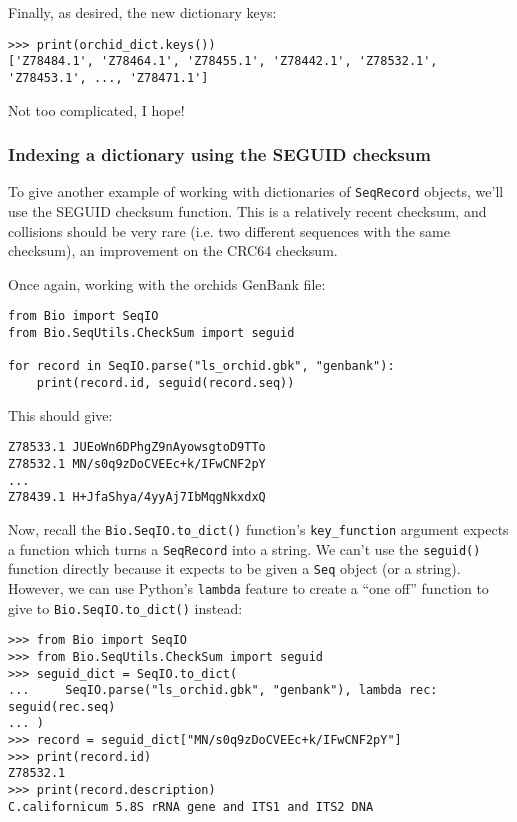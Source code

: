 \noindent Finally, as desired, the new dictionary keys:

\begin{verbatim}
>>> print(orchid_dict.keys())
['Z78484.1', 'Z78464.1', 'Z78455.1', 'Z78442.1', 'Z78532.1', 'Z78453.1', ..., 'Z78471.1']
\end{verbatim}

\noindent Not too complicated, I hope!

\subsubsection{Indexing a dictionary using the SEGUID checksum}

To give another example of working with dictionaries of \verb|SeqRecord| objects, we'll use the SEGUID checksum function.  This is a relatively recent checksum, and collisions should be very rare (i.e. two different sequences with the same checksum), an improvement on the CRC64 checksum.

Once again, working with the orchids GenBank file:

\begin{verbatim}
from Bio import SeqIO
from Bio.SeqUtils.CheckSum import seguid

for record in SeqIO.parse("ls_orchid.gbk", "genbank"):
    print(record.id, seguid(record.seq))
\end{verbatim}

\noindent This should give:

\begin{verbatim}
Z78533.1 JUEoWn6DPhgZ9nAyowsgtoD9TTo
Z78532.1 MN/s0q9zDoCVEEc+k/IFwCNF2pY
...
Z78439.1 H+JfaShya/4yyAj7IbMqgNkxdxQ
\end{verbatim}

Now, recall the \verb|Bio.SeqIO.to_dict()| function's \verb|key_function| argument expects a function which turns a \verb|SeqRecord| into a string.  We can't use the \verb|seguid()| function directly because it expects to be given a \verb|Seq| object (or a string).  However, we can use Python's \verb|lambda| feature to create a ``one off'' function to give to \verb|Bio.SeqIO.to_dict()| instead:

\begin{verbatim}
>>> from Bio import SeqIO
>>> from Bio.SeqUtils.CheckSum import seguid
>>> seguid_dict = SeqIO.to_dict(
...     SeqIO.parse("ls_orchid.gbk", "genbank"), lambda rec: seguid(rec.seq)
... )
>>> record = seguid_dict["MN/s0q9zDoCVEEc+k/IFwCNF2pY"]
>>> print(record.id)
Z78532.1
>>> print(record.description)
C.californicum 5.8S rRNA gene and ITS1 and ITS2 DNA
\end{verbatim}

